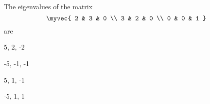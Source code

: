 \item The eigenvalues of the matrix $$\myvec{ 2 & 3 & 0 \\ 3 & 2 & 0 \\ 0 & 0 & 1 }$$ are\hfill{}


\begin{enumerate} \begin{multicols}{4}
	\item 5, 2, -2 \item -5, -1, -1 \item 5, 1, -1 \item -5, 1, 1
\end{multicols} \end{enumerate}
